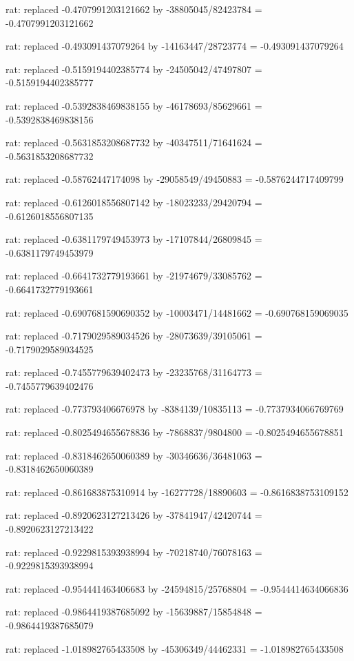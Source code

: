 \documentclass[a4paper,10pt]{article}
\begin{document}
\begin{eulernotebook}
\begin{eulercomment}
\begin{eulercomment}
\begin{eulercomment}
\begin{eulercomment}
\begin{eulercomment}
\begin{eulercomment}
\begin{eulercomment}
\begin{eulercomment}
\begin{eulercomment}
\begin{eulercomment}
\begin{eulercomment}
\begin{eulercomment}
\begin{eulercomment}
\begin{eulercomment}
\begin{eulercomment}
\begin{eulercomment}
\begin{euleroutput}
  rat: replaced -0.4707991203121662 by -38805045/82423784 = -0.4707991203121662
  
  rat: replaced -0.493091437079264 by -14163447/28723774 = -0.493091437079264
  
  rat: replaced -0.5159194402385774 by -24505042/47497807 = -0.5159194402385777
  
  rat: replaced -0.5392838469838155 by -46178693/85629661 = -0.5392838469838156
  
  rat: replaced -0.5631853208687732 by -40347511/71641624 = -0.5631853208687732
  
  rat: replaced -0.58762447174098 by -29058549/49450883 = -0.5876244717409799
  
  rat: replaced -0.6126018556807142 by -18023233/29420794 = -0.6126018556807135
  
  rat: replaced -0.6381179749453973 by -17107844/26809845 = -0.6381179749453979
  
  rat: replaced -0.6641732779193661 by -21974679/33085762 = -0.6641732779193661
  
  rat: replaced -0.6907681590690352 by -10003471/14481662 = -0.690768159069035
  
  rat: replaced -0.7179029589034526 by -28073639/39105061 = -0.7179029589034525
  
  rat: replaced -0.7455779639402473 by -23235768/31164773 = -0.7455779639402476
  
  rat: replaced -0.773793406676978 by -8384139/10835113 = -0.7737934066769769
  
  rat: replaced -0.8025494655678836 by -7868837/9804800 = -0.8025494655678851
  
  rat: replaced -0.8318462650060389 by -30346636/36481063 = -0.8318462650060389
  
  rat: replaced -0.861683875310914 by -16277728/18890603 = -0.8616838753109152
  
  rat: replaced -0.8920623127213426 by -37841947/42420744 = -0.8920623127213422
  
  rat: replaced -0.9229815393938994 by -70218740/76078163 = -0.9229815393938994
  
  rat: replaced -0.954441463406683 by -24594815/25768804 = -0.9544414634066836
  
  rat: replaced -0.9864419387685092 by -15639887/15854848 = -0.9864419387685079
  
  rat: replaced -1.018982765433508 by -45306349/44462331 = -1.018982765433508
  

\end{euleroutput}
\end{eulercomment}
\end{eulercomment}
\end{eulercomment}
\end{eulercomment}
\end{eulercomment}
\end{eulercomment}
\end{eulercomment}
\end{eulercomment}
\end{eulercomment}
\end{eulercomment}
\end{eulercomment}
\end{eulercomment}
\end{eulercomment}
\end{eulercomment}
\end{eulercomment}
\end{eulercomment}
\end{eulernotebook}
\end{document}

